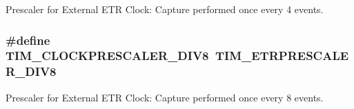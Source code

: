 Prescaler for External E\-T\-R Clock\-: Capture performed once every 4 events. \hypertarget{group___t_i_m___clock___prescaler_ga86f147be5654631b21aa391a001401d5}{
\subsubsection[{T\-I\-M\-\_\-\-C\-L\-O\-C\-K\-P\-R\-E\-S\-C\-A\-L\-E\-R\-\_\-\-D\-I\-V8}]{\setlength{\rightskip}{0pt plus 5cm}\#define T\-I\-M\-\_\-\-C\-L\-O\-C\-K\-P\-R\-E\-S\-C\-A\-L\-E\-R\-\_\-\-D\-I\-V8~{\bf T\-I\-M\-\_\-\-E\-T\-R\-P\-R\-E\-S\-C\-A\-L\-E\-R\-\_\-\-D\-I\-V8}}}\label{group___t_i_m___clock___prescaler_ga86f147be5654631b21aa391a001401d5}
Prescaler for External E\-T\-R Clock\-: Capture performed once every 8 events. 